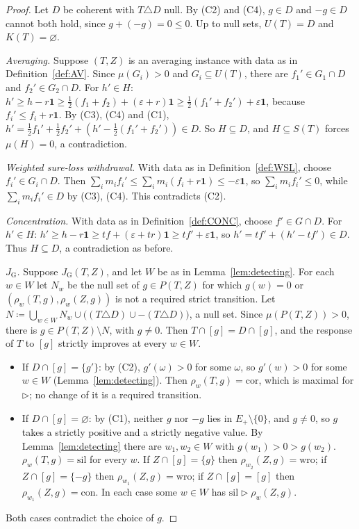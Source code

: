 \documentclass[11pt]{article}
\theoremstyle{definition}
\newcommand{\one}{\mathbf 1}
\newcommand{\cor}{\mathrm{cor}}
\newcommand{\sil}{\mathrm{sil}}
\newcommand{\wro}{\mathrm{wro}}
\newcommand{\con}{\mathrm{con}}
\newcommand{\GU}{\mathrm{G}}
\begin{document}
\begin{proof}
Let $D$ be coherent with $T\triangle D$ null. By (C2) and (C4), $g\in D$ and $-g\in D$ cannot both hold, since $g+(-g)=0\le0$. Up to null sets, $U(T)=D$ and $K(T)=\varnothing$.

\emph{Averaging.} Suppose $(T,Z)$ is an averaging instance with data as in Definition~\ref{def:AV}. Since $\mu(G_i)>0$ and $G_i\subseteq U(T)$, there are $f_1'\in G_1\cap D$ and $f_2'\in G_2\cap D$. For $h'\in H$: $h'\ge h-r\one\ge\frac12(f_1+f_2)+(\varepsilon+r)\one\ge\frac12(f_1'+f_2')+\varepsilon\one$, because $f_i'\le f_i+r\one$. By (C3), (C4) and (C1), $h'=\frac12f_1'+\frac12f_2'+(h'-\frac12(f_1'+f_2'))\in D$. So $H\subseteq D$, and $H\subseteq S(T)$ forces $\mu(H)=0$, a contradiction.

\emph{Weighted sure-loss withdrawal.} With data as in Definition~\ref{def:WSL}, choose $f_i'\in G_i\cap D$. Then $\sum_im_if_i'\le\sum_im_i(f_i+r\one)\le-\varepsilon\one$, so $\sum_im_if_i'\le0$, while $\sum_im_if_i'\in D$ by (C3), (C4). This contradicts (C2).

\emph{Concentration.} With data as in Definition~\ref{def:CONC}, choose $f'\in G\cap D$. For $h'\in H$: $h'\ge h-r\one\ge tf+(\varepsilon+tr)\one\ge tf'+\varepsilon\one$, so $h'=tf'+(h'-tf')\in D$. Thus $H\subseteq D$, a contradiction as before.

\emph{$J_\GU$.} Suppose $J_\GU(T,Z)$, and let $W$ be as in Lemma~\ref{lem:detecting}. For each $w\in W$ let $N_w$ be the null set of $g\in P(T,Z)$ for which $g(w)=0$ or $(\rho_w(T,g),\rho_w(Z,g))$ is not a required strict transition. Let $N\coloneqq\bigcup_{w\in W}N_w\cup\bigl((T\triangle D)\cup-(T\triangle D)\bigr)$, a null set. Since $\mu(P(T,Z))>0$, there is $g\in P(T,Z)\setminus N$, with $g\ne0$. Then $T\cap[g]=D\cap[g]$, and the response of $T$ to $[g]$ strictly improves at every $w\in W$.
\begin{itemize}
\item If $D\cap[g]=\{g'\}$: by (C2), $g'(\omega)>0$ for some $\omega$, so $g'(w)>0$ for some $w\in W$ (Lemma~\ref{lem:detecting}). Then $\rho_w(T,g)=\cor$, which is maximal for $\rhd$; no change of it is a required transition.
\item If $D\cap[g]=\varnothing$: by (C1), neither $g$ nor $-g$ lies in $E_+\setminus\{0\}$, and $g\ne0$, so $g$ takes a strictly positive and a strictly negative value. By Lemma~\ref{lem:detecting} there are $w_1,w_2\in W$ with $g(w_1)>0>g(w_2)$. $\rho_w(T,g)=\sil$ for every $w$. If $Z\cap[g]=\{g\}$ then $\rho_{w_2}(Z,g)=\wro$; if $Z\cap[g]=\{-g\}$ then $\rho_{w_1}(Z,g)=\wro$; if $Z\cap[g]=[g]$ then $\rho_{w_1}(Z,g)=\con$. In each case some $w\in W$ has $\sil\rhd\rho_w(Z,g)$.
\end{itemize}
Both cases contradict the choice of $g$.
\end{proof}
\end{document}
